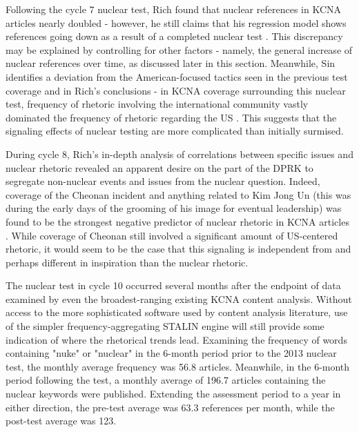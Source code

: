 \documentclass{article}
\begin{document}
Following the cycle 7 nuclear test, Rich found that nuclear references in KCNA articles nearly doubled - however, he still claims that his regression model shows references going down as a result of a completed nuclear test \cite{rich14}. This discrepancy may be explained by controlling for other factors - namely, the general increase of nuclear references over time, as discussed later in this section. Meanwhile, Sin identifies a deviation from the American-focused tactics seen in the previous test coverage and in Rich's conclusions - in KCNA coverage surrounding this nuclear test, frequency of rhetoric involving the international community vastly dominated the frequency of rhetoric regarding the US \cite{sin}. This suggests that the signaling effects of nuclear testing are more complicated than initially surmised.

During cycle 8, Rich's in-depth analysis of correlations between specific issues and nuclear rhetoric revealed an apparent desire on the part of the DPRK to segregate non-nuclear events and issues from the nuclear question. Indeed, coverage of the Cheonan incident and anything related to Kim Jong Un (this was during the early days of the grooming of his image for eventual leadership) was found to be the strongest negative predictor of nuclear rhetoric in KCNA articles \cite{rich12}. While coverage of Cheonan still involved a significant amount of US-centered rhetoric\cite{sin}, it would seem to be the case that this signaling is independent from and perhaps different in inspiration than the nuclear rhetoric.

The nuclear test in cycle 10 occurred several months after the endpoint of data examined by even the broadest-ranging existing KCNA content analysis\cite{rich14}. Without access to the more sophisticated software used by content analysis literature, use of the simpler frequency-aggregating STALIN engine will still provide some indication of where the rhetorical trends lead. Examining the frequency of words containing "nuke" or "nuclear" in the 6-month period prior to the 2013 nuclear test, the monthly average frequency was 56.8 articles. Meanwhile, in the 6-month period following the test, a monthly average of 196.7 articles containing the nuclear keywords were published. Extending the assessment period to a year in either direction, the pre-test average was 63.3 references per month, while the post-test average was 123.
\end{document}
